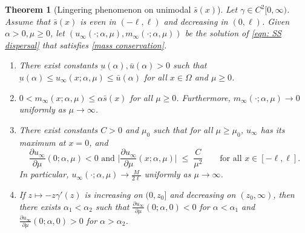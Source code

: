 \documentclass[10pt,a4paper]{amsart}
\newtheorem{theorem}{Theorem}
\begin{document}
\begin{theorem}[Lingering phenomenon on unimodal $\bar s(x)$]\label{thm:lingering}
Let $\gamma\in C^2[0,\infty)$. Assume that $\bar s(x)$ is even in $(-\ell,\ell)$ and decreasing in $(0,\ell)$. Given $\alpha>0,\mu\ge0$, let $(u_\infty(\cdot;\alpha,\mu),m_\infty(\cdot;\alpha,\mu))$ be the solution of \eqref{eqn: SS dispersal} that satisfies \eqref{mass conservation}. 
\begin{enumerate}
\item[(i)] There exist constants $\underbar{u}(\alpha),\bar u(\alpha) >0$ such that $ \underbar u(\alpha)\le u_\infty(x;\alpha,\mu)\le \bar u(\alpha)$ for all $x\in \Omega$ and $\mu\ge 0$.
\item[(ii)]  $0<m_\infty(x;\alpha,\mu)\le \alpha\bar s(x)$ for all $\mu\ge 0$. Furthermore, $m_\infty(\cdot;\alpha,\mu)\to 0$ uniformly as $\mu\to\infty$.

    \item [(iii)] There exist constants $C>0$ and $\mu_0$ such that for all $\mu\ge \mu_0$, $u_\infty$ has its maximum at $x=0$, and
\[
    \frac{\partial u_\infty}{\partial \mu}(0;\alpha,\mu)<0 \text{ and } \bigl|\frac{\partial u_\infty}{\partial \mu}(x;\alpha,\mu)\bigr| \;\le\; \frac{C}{\mu^2}
    \qquad \text{for all } x\in[-\ell,\ell].
\]
In particular, $u_\infty(\cdot;\alpha,\mu)\to \frac{M}{2\ell}$ uniformly as $\mu\to\infty$. 
    
    \item[(iv)] If $z\mapsto -z\gamma'(z)$ is increasing on $(0,z_0]$ and decreasing on $(z_0,\infty)$, then there exists $\alpha_1<\alpha_2$ such that $\frac{\partial u_\infty}{\partial \mu}(0;\alpha,0)<0$ for $\alpha <\alpha_1$ and $\frac{\partial u_\infty}{\partial \mu}(0;\alpha,0)>0$ for $\alpha >\alpha_2$.
\end{enumerate}
\end{theorem}
\end{document}
